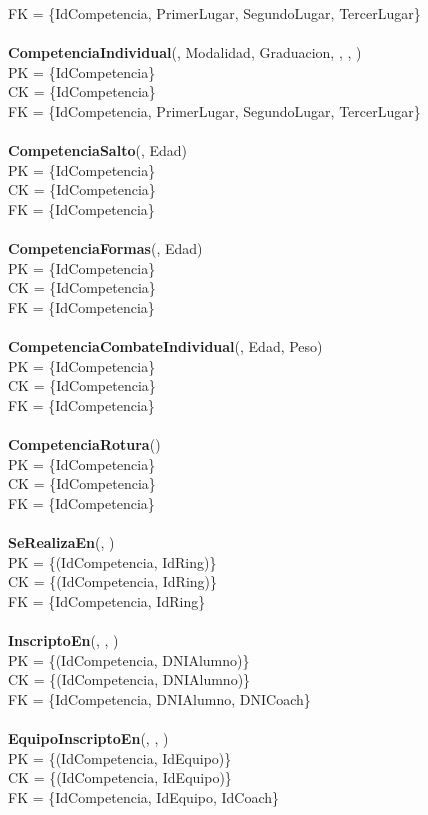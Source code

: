 FK = \{IdCompetencia, PrimerLugar, SegundoLugar, TercerLugar\}\\
\\
\textbf{CompetenciaIndividual}(, Modalidad, Graduacion, , , )\\
PK = \{IdCompetencia\}\\
CK = \{IdCompetencia\}\\
FK = \{IdCompetencia, PrimerLugar, SegundoLugar, TercerLugar\}\\
\\
\textbf{CompetenciaSalto}(, Edad)\\
PK = \{IdCompetencia\}\\
CK = \{IdCompetencia\}\\
FK = \{IdCompetencia\}\\
\\
\textbf{CompetenciaFormas}(, Edad)\\
PK = \{IdCompetencia\}\\
CK = \{IdCompetencia\}\\
FK = \{IdCompetencia\}\\
\\
\textbf{CompetenciaCombateIndividual}(, Edad, Peso)\\
PK = \{IdCompetencia\}\\
CK = \{IdCompetencia\}\\
FK = \{IdCompetencia\}\\
\\
\textbf{CompetenciaRotura}()\\
PK = \{IdCompetencia\}\\
CK = \{IdCompetencia\}\\
FK = \{IdCompetencia\}\\
\\
\textbf{SeRealizaEn}(, )\\
PK = \{(IdCompetencia, IdRing)\}\\
CK = \{(IdCompetencia, IdRing)\}\\
FK = \{IdCompetencia, IdRing\}\\
\\
\textbf{InscriptoEn}(, , )\\
PK = \{(IdCompetencia, DNIAlumno)\}\\
CK = \{(IdCompetencia, DNIAlumno)\}\\
FK = \{IdCompetencia, DNIAlumno, DNICoach\}\\
\\
\textbf{EquipoInscriptoEn}(, , )\\
PK = \{(IdCompetencia, IdEquipo)\}\\
CK = \{(IdCompetencia, IdEquipo)\}\\
FK = \{IdCompetencia, IdEquipo, IdCoach\}\\
\\
